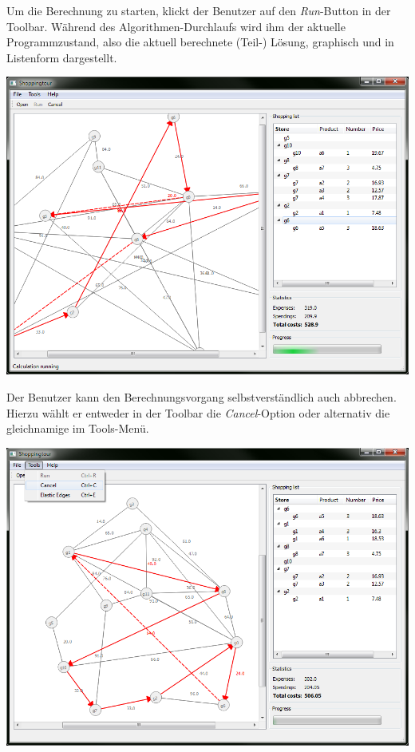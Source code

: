 \newpage

Um die Berechnung zu starten, klickt der Benutzer auf den \emph{Run}-Button in der Toolbar. Während des Algorithmen-Durchlaufs wird ihm der aktuelle Programmzustand, also die aktuell berechnete (Teil-) Lösung, graphisch und in Listenform dargestellt.

\includegraphics[width=1\textwidth]{resourcen/walkthrough/3-running-clingo.png}

\newpage

Der Benutzer kann den Berechnungsvorgang selbstverständlich auch abbrechen. Hierzu wählt er entweder in der Toolbar die \emph{Cancel}-Option oder alternativ die gleichnamige im Tools-Menü.

\includegraphics[width=1\textwidth]{resourcen/walkthrough/4-cancel.png}

